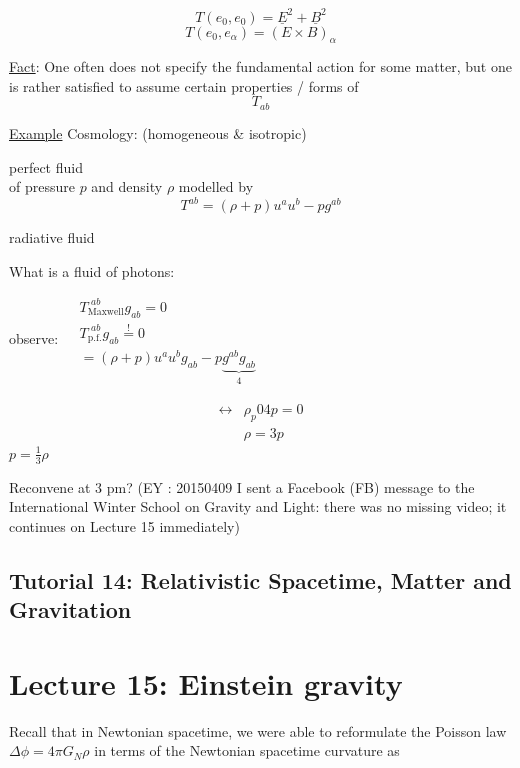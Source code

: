 	\[
	T(e_0,e_0) = \underline{E}^2+\underline{B}^2
	\]
	\[
	T(e_0,e_{\alpha}) = (E\times B)_{\alpha}
	\]
	
	\underline{Fact}: One often does not specify the fundamental action for some matter, but one is rather satisfied to assume certain properties / forms of 
	\[
	T_{ab}
	\]
	
	\underline{Example} Cosmology: (homogeneous \& isotropic)
	
	perfect fluid \\
	
	of pressure $p$ and density $\rho$
	modelled by
	\[
	T^{ab} = (\rho + p)u^a u^b - pg^{ab}
	\]
	
	radiative fluid
	
	What is a fluid of photons:
	
	observe: $\begin{aligned}
	& T_{\text{Maxwell}}^{ \, \, ab} g_{ab} = 0 \\ 
	& T_{\text{p.f.}}^{ \, \, ab} g_{ab} \overset{!}{=} 0 \\
	& = (\rho + p)u^a u^b g_{ab} - p\underbrace{ g^{ab} g_{ab} }_{ 4}
	\end{aligned}$
	
	\[
	\begin{aligned}
	\leftrightarrow & \rho _ p 04p = 0 \\ 
	& \rho = 3p
	\end{aligned}
	\]
	$p=\frac{1}{3}\rho$
	
	Reconvene at 3 pm?  (EY : 20150409 I sent a Facebook (FB) message to the International Winter School on Gravity and Light: there was no missing video; it continues on Lecture 15 immediately)
	
	\subsection*{Tutorial 14: Relativistic Spacetime, Matter and Gravitation}
	
	
	
	
	
	
	
	\section{Lecture 15: Einstein gravity}
	
	Recall that in Newtonian spacetime, we were able to reformulate the Poisson law $\Delta \phi = 4\pi G_N \rho$ in terms of the Newtonian spacetime curvature as 
	
